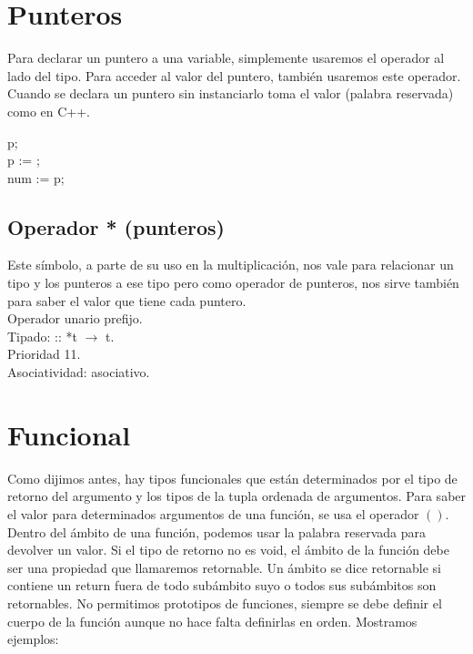 \newpage
\section{Punteros}
Para declarar un puntero a una variable, simplemente usaremos el operador \operator{*} al lado del tipo. Para acceder al valor del puntero, también usaremos este operador. Cuando se declara un puntero sin instanciarlo toma el valor  (palabra reservada) como en C++.
\begin{algorithm}
	\Integer{}\operator{*} p;  \\
	\operator{*}p := ;  \\
	\Integer{} num := \operator{*}p; 
\end{algorithm}


\subsection*{Operador * (punteros)}
Este símbolo, a parte de su uso en la multiplicación, nos vale para relacionar un tipo y los punteros a ese tipo pero como operador de punteros, nos sirve también para saber el valor que tiene cada puntero. 
\\Operador  unario prefijo.
\\Tipado: \Ptr :: *t $\rightarrow$ t. 
\\Prioridad 11.
\\Asociatividad: asociativo.





\section{Funcional}
Como dijimos antes, hay tipos funcionales que están determinados por el tipo de retorno del argumento y los tipos de la tupla ordenada de argumentos. 
Para saber el valor para determinados argumentos de una función, se usa el operador $()$. Dentro del ámbito de una función, podemos usar la palabra reservada  para devolver un valor. Si el tipo de retorno no es void, el ámbito de la función debe ser una propiedad que llamaremos retornable. Un ámbito se dice retornable si contiene un return fuera de todo subámbito suyo o todos sus subámbitos son retornables. 
No permitimos prototipos de funciones, siempre se debe definir el cuerpo de la función aunque no hace falta definirlas en orden.
	Mostramos ejemplos:

